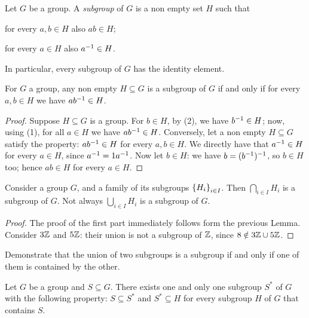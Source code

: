 \begin{definition}
Let \(G\) be a group. A {\em subgroup} of \(G\) is a non empty set \(H\) such that
\begin{tcbenum}
\item for every \(a, b \in H\) also \(a b \in H\);
\item for every \(a \in H\) also \(a^{-1} \in H\).
\end{tcbenum}
\end{definition}

In particular, every subgroup of \(G\) has the identity element. 

\begin{lemma}\label{lem:SubgroupsCond}
For \(G\) a group, any non empty \(H \subseteq G\) is a subgroup of \(G\) if and only if for every \(a, b \in H\) we have \(a b^{-1} \in H\).
\end{lemma}

\begin{proof}
Suppose \(H \subseteq G\) is a group. For \(b \in H\), by (2), we have \(b^{-1} \in H\); now, using (1), for all \(a \in H\) we have \(ab^{-1} \in H\). Conversely, let a non empty \(H \subseteq G\) satisfy the property: \(a b^{-1} \in H\) for every \(a, b \in H\). We directly have that \(a^{-1} \in H\) for every \(a \in H\), since \(a^{-1} = 1 a^{-1}\). Now let \(b \in H\): we have \(b = (b^{-1})^{-1}\), so \(b \in H\) too; hence \(a b \in H\) for every \(a \in H\).
\end{proof}

\begin{proposition}
Consider a group \(G\), and a family of its subgroups \(\left\{H_i\right\}_{i \in I}\). Then \(\bigcap_{i \in I} H_i\) is a subgroup of \(G\). Not always \(\bigcup_{i \in I} H_i\) is a subgroup of \(G\).
\end{proposition}

\begin{proof}
The proof of the first part immediately follows form the previous Lemma. Consider \(3 \mathbb Z\) and \(5\mathbb Z\): their union is not a subgroup of \(\mathbb Z\), since \(8 \notin 3\mathbb Z \cup 5\mathbb Z\).
\end{proof}

\begin{exercise}
Demonstrate that the union of two subgroups is a subgroup if and only if one of them is contained by the other.
\end{exercise}

\begin{proposition}
Let \(G\) be a group and \(S \subseteq G\). There exists one and only one subgroup \(S^\ast\) of \(G\) with the following property: \(S \subseteq S^\ast\) and \(S^\ast \subseteq H\) for every subgroup \(H\) of \(G\) that contains \(S\).
\end{proposition}

